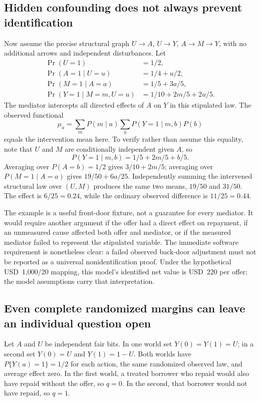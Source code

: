 \subsection{Hidden confounding does not always prevent identification}

Now assume the precise structural graph $U\to A$, $U\to Y$,
$A\to M\to Y$, with no additional arrows and independent disturbances.
Let
\begin{align*}
 \Pr(U=1)&=1/2,\\
 \Pr(A=1\mid U=u)&=1/4+u/2,\\
 \Pr(M=1\mid A=a)&=1/5+3a/5,\\
 \Pr(Y=1\mid M=m,U=u)&=1/10+2m/5+2u/5.
\end{align*}
The mediator intercepts all directed effects of $A$ on $Y$ in this stipulated
law. The observed functional
\[
 \mu_a=\sum_m P(m\mid a)\sum_b P(Y=1\mid m,b)P(b)
\]
equals the intervention mean here. To verify rather than assume this equality,
note that $U$ and $M$ are conditionally independent given $A$, so
\[
 P(Y=1\mid m,b)=1/5+2m/5+b/5.
\]
Averaging over $P(A=b)=1/2$ gives $3/10+2m/5$; averaging over
$P(M=1\mid A=a)$ gives $19/50+6a/25$.
Independently summing the intervened structural law over $(U,M)$ produces
the same two means, $19/50$ and $31/50$. The effect is $6/25=0.24$,
while the ordinary observed difference is $11/25=0.44$.

The example is a useful front-door fixture, not a guarantee for every mediator.
It would require another argument if the offer had a direct effect on repayment,
if an unmeasured cause affected both offer and mediator, or if the measured
mediator failed to represent the stipulated variable. The immediate software
requirement is nonetheless clear: a failed observed back-door adjustment must
not be reported as a universal nonidentification proof. Under the hypothetical
USD~1,000/20 mapping, this model's identified net value is USD~220 per offer;
the model assumptions carry that interpretation.

\subsection{Even complete randomized margins can leave an individual question open}

Let $A$ and $U$ be independent fair bits. In one world set
$Y(0)=Y(1)=U$; in a second set $Y(0)=U$ and $Y(1)=1-U$.
Both worlds have $P\{Y(a)=1\}=1/2$ for each action, the same randomized
observed law, and average effect zero. In the first world, a treated borrower
who repaid would also have repaid without the offer, so $q=0$. In the second,
that borrower would not have repaid, so $q=1$.

